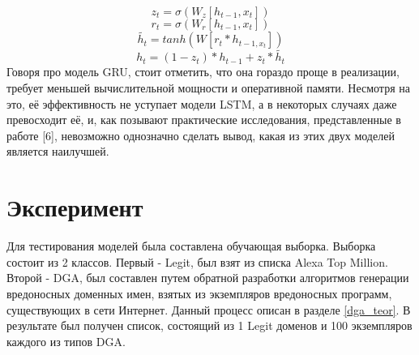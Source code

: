     \begin{equation}\label{gr:1}
    z_{t}=\sigma(W_{z}[h_{t-1},x_{t}])
    \end{equation}
    \begin{equation}\label{gr:2}
    r_{t}=\sigma(W_{r}[h_{t-1},x_{t}])
    \end{equation}
    \begin{equation}\label{gr:3}
    \tilde{h_{t}}=tanh(W[r_{t}*h_{t-1,x_{t}}])
    \end{equation}
    \begin{equation}\label{gr:4}
    h_{t}=(1-z_{t})*h_{t-1}+z_{t}*\tilde{h_{t}}
    \end{equation}
    Говоря про модель GRU, стоит отметить, что она гораздо проще в реализации, требует меньшей вычислительной мощности и оперативной памяти. Несмотря на это, её эффективность не уступает модели LSTM, а в некоторых случаях даже превосходит её, и, как позывают практические исследования, представленные в работе [6], невозможно однозначно сделать вывод, какая из этих двух моделей является наилучшей.
\clearpage

\section{Эксперимент}\label{experiment}
    Для тестирования моделей была составлена обучающая выборка. Выборка состоит из 2 классов. Первый - Legit, был взят из списка Alexa Top Million. Второй - DGA, был составлен путем обратной разработки алгоритмов генерации вредоносных доменных имен, взятых из экземпляров вредоносных программ, существующих в сети Интернет. Данный процесс описан в разделе \ref{dga_teor}. В результате был получен список, состоящий из 1 Legit доменов и 100 экземпляров каждого из типов DGA.
